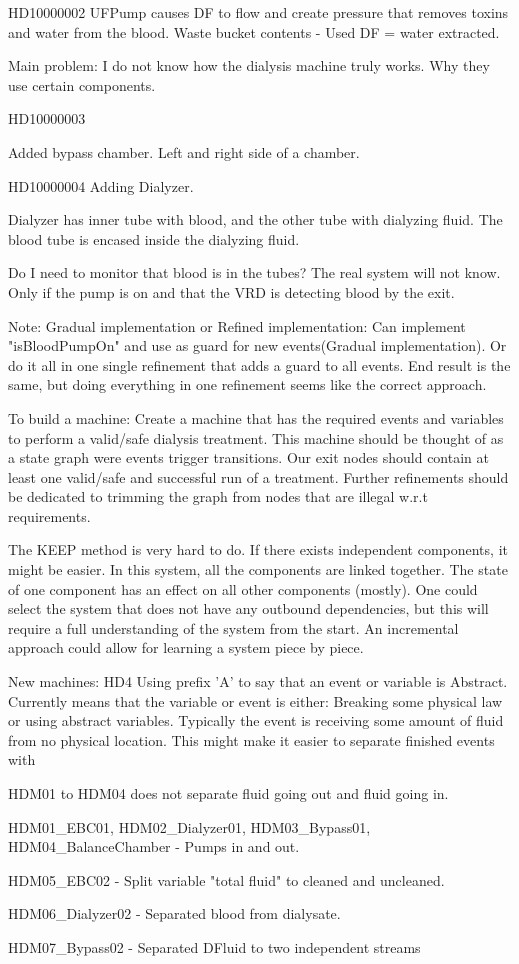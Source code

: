 HD10000002
UFPump causes DF to flow and create pressure that removes toxins and water from the blood. Waste bucket contents - Used DF = water extracted.

Main problem: I do not know how the dialysis machine truly works. Why they use certain components.


HD10000003

Added bypass chamber. Left and right side of a chamber.


HD10000004
Adding Dialyzer.

Dialyzer has inner tube with blood, and the other tube with dialyzing fluid. The blood tube is encased inside the dialyzing fluid. 

Do I need to monitor that blood is in the tubes? The real system will not know. Only if the pump is on and that the VRD is detecting blood by the exit.

Note: Gradual implementation or Refined implementation: Can implement "isBloodPumpOn" and use as guard for new events(Gradual implementation). Or do it all in one single refinement that adds a guard to all events. End result is the same, but doing everything in one refinement seems like the correct approach. 

To build a machine:
Create a machine that has the required events and variables to perform a valid/safe dialysis treatment. This machine should be thought of as a state graph were events trigger transitions. Our exit nodes should contain at least one valid/safe and successful run of a treatment. Further refinements should be dedicated to trimming the graph from nodes that are illegal w.r.t requirements.

The KEEP method is very hard to do. If there exists independent components, it might be easier. In this system, all the components are linked together.  The state of one component has an effect on all other components (mostly). One could select the system that does not have any outbound dependencies, but this will require a full understanding of the system from the start. An incremental approach could allow for learning a system piece by piece. 



New machines: HD4
Using prefix 'A' to say that an event or variable is Abstract.
Currently means that the variable or event is either: Breaking some physical law or using abstract variables. Typically the event is receiving some amount of fluid from no physical location.  This might make it easier to separate finished events with  


HDM01 to HDM04 does not separate fluid going out and fluid going in.

HDM01\_EBC01, HDM02\_Dialyzer01, HDM03\_Bypass01, HDM04\_BalanceChamber - Pumps in and out.

HDM05\_EBC02 - Split variable "total fluid" to cleaned and uncleaned. 

HDM06\_Dialyzer02 - Separated blood from dialysate.

HDM07\_Bypass02 - Separated DFluid to two independent streams









